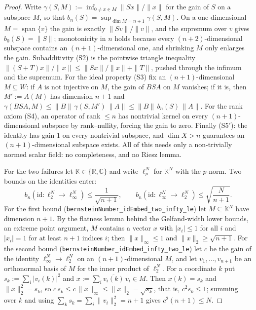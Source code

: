 \begin{proof}
\leanok
Write $\gamma(S, M) := \inf_{0 \ne x \in M} \|Sx\|/\|x\|$ for the gain of
$S$ on a subspace $M$, so that $b_n(S) = \sup_{\dim M = n+1} \gamma(S, M)$.
On a one-dimensional $M = \operatorname{span}\{v\}$ the gain is exactly
$\|Sv\|/\|v\|$, and the supremum over $v$ gives $b_0(S) = \|S\|$;
monotonicity in $n$ holds because every $(n+2)$-dimensional subspace
contains an $(n+1)$-dimensional one, and shrinking $M$ only enlarges the
gain. Subadditivity (S2) is the pointwise triangle inequality
$\|(S+T)x\|/\|x\| \le \|Sx\|/\|x\| + \|T\|$, pushed through the infimum and
the supremum. For the ideal property (S3) fix an $(n+1)$-dimensional
$M \subseteq W$: if $A$ is not injective on $M$, the gain of $BSA$ on $M$
vanishes; if it is, then $M' := A(M)$ has dimension $n+1$ and
$\gamma(BSA, M) \le \|B\| \, \gamma(S, M') \, \|A\| \le
\|B\| \, b_n(S) \, \|A\|$. For the rank axiom (S4), an operator of rank
$\le n$ has nontrivial kernel on every $(n+1)$-dimensional subspace by
rank--nullity, forcing the gain to zero. Finally (S5$'$): the identity has
gain $1$ on every nontrivial subspace, and $\dim X > n$ guarantees an
$(n+1)$-dimensional subspace exists. All of this needs only a non-trivially
normed scalar field: no completeness, and no Riesz lemma.

For the two failures let $\mathbb{K} \in \{\mathbb{R}, \mathbb{C}\}$ and
write $\ell_p^N$ for $\mathbb{K}^N$ with the $p$-norm. Two bounds on the
identities enter:
\[
  b_n(\mathrm{id} : \ell_2^N \to \ell_\infty^N) \le \frac{1}{\sqrt{n+1}},
  \qquad
  b_n(\mathrm{id} : \ell_\infty^N \to \ell_2^N) \le \sqrt{\frac{N}{n+1}} .
\]
For the first bound (\texttt{bernsteinNumber\_idEmbed\_two\_infty\_le}) let
$M \subseteq \mathbb{K}^N$ have dimension $n + 1$. By the flatness lemma
behind the Gelfand-width lower bounds, an extreme point argument, $M$
contains a vector $x$ with $|x_i| \le 1$ for all $i$ and $|x_i| = 1$ for at
least $n + 1$ indices $i$; then $\|x\|_\infty \le 1$ and
$\|x\|_2 \ge \sqrt{n+1}$. For the second bound
(\texttt{bernsteinNumber\_idEmbed\_infty\_two\_le}) let $c$ be the gain of
the identity $\ell_\infty^N \to \ell_2^N$ on an $(n+1)$-dimensional $M$, and
let
$v_1, \dots, v_{n+1}$ be an orthonormal basis of $M$ for the inner product
of $\ell_2^N$. For a coordinate $k$ put $s_k := \sum_i |v_i(k)|^2$ and
$x := \sum_i \overline{v_i(k)} \, v_i \in M$. Then $x(k) = s_k$ and
$\|x\|_2^2 = s_k$, so $c \, s_k \le c \, \|x\|_\infty \le \|x\|_2 =
\sqrt{s_k}$, that is, $c^2 s_k \le 1$; summing over $k$ and using
$\sum_k s_k = \sum_i \|v_i\|_2^2 = n + 1$ gives $c^2 (n+1) \le N$.


\end{proof}
